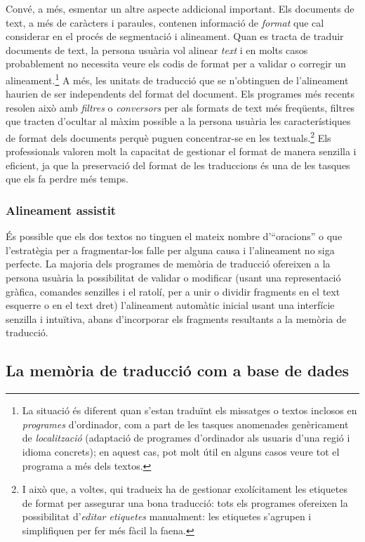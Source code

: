 Convé, a més, esmentar un altre aspecte addicional important. Els
documents de text, a més de caràcters i paraules, contenen informació
de \emph{format} que cal considerar en el procés de segmentació i
alineament.  Quan es tracta de traduir documents de text, la persona
usuària vol alinear \emph{text} i en molts casos probablement no
necessita veure els codis de format per a validar o corregir un
alineament.\footnote{La situació és diferent quan s'estan traduïnt els
  missatges o textos inclosos en \emph{programes} d'ordinador, com a
  part de les tasques anomenades genèricament de \emph{localització}
  (adaptació de programes d'ordinador als usuaris d'una regió i idioma
  concrets); en aquest cas, pot molt útil en alguns casos veure tot el
  programa a més dels textos.} A més, les unitats de traducció que se
n'obtinguen de l'alineament haurien de ser independents del format del
document. Els programes més recents resolen això amb \emph{filtres} o
\emph{conversors} per als formats de text més freqüents, filtres que
tracten d'ocultar al màxim possible a la persona usuària les
característiques de format dels documents perquè puguen concentrar-se
en les textuals.\footnote{I això que, a voltes, qui tradueix ha de gestionar exolícitament les etiquetes de format per assegurar una bona traducció: tots els programes ofereixen la possibilitat d'\emph{editar etiquetes} manualment: les etiquetes s'agrupen i simplifiquen per fer més fàcil la faena.} Els professionals valoren molt la capacitat de
gestionar el format de manera senzilla i eficient, ja que la
preservació del format de les traduccions és una de les tasques que
els fa perdre més temps.


\subsubsection{Alineament assistit}

És possible que els dos textos no tinguen el mateix nombre
d'``oracions'' o que l'estratègia per a fragmentar-los falle per
alguna causa i l'alineament no siga perfecte. La majoria dels
programes de memòria de traducció ofereixen a la persona usuària la
possibilitat de validar o modificar (usant una representació gràfica,
comandes senzilles i el ratolí, per a unir o dividir fragments en el
text esquerre o en el text dret) l'alineament automàtic inicial usant
una interfície senzilla i intuïtiva, abans d'incorporar els fragments
resultants a la memòria de traducció.


\subsection{La memòria de traducció com a base de dades}

